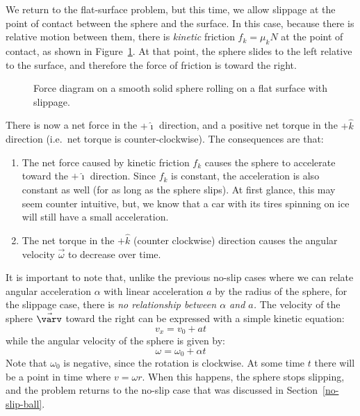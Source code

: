 \documentclass{../../oss-handout}
\newcommand{\iii}{\hat\imath}}
\newcommand{\kkk}{\hat k}}
\begin{document}
We return to the flat-surface problem, but this time, we allow slippage at the
point of contact between the sphere and the surface. In this case, because there
is relative motion between them, there is \emph{kinetic} friction $f_k=\mu_kN$
at the point of contact, as shown in Figure~\ref{slip1}. At that point, the
sphere slides to the left relative to the surface, and therefore the force of
friction is toward the right.
\begin{figure}[!ht]
  \centering
  \caption{Force diagram on a smooth solid sphere rolling on a flat surface with
    slippage.}
  \label{slip1}
\end{figure}

There is now a net force in the $+\iii$ direction, and a positive net torque in
the $+\kkk$ direction (i.e.\ net torque is counter-clockwise). The consequences
are that:
\begin{enumerate}[topsep=0pt]
\item The net force caused by kinetic friction $f_k$ causes the sphere to
  accelerate toward the $+\iii$ direction. Since $f_k$ is constant, the
  acceleration is also constant as well (for as long as the sphere slips). At
  first glance, this may seem counter intuitive, but, we know that a car with
  its tires spinning on ice will still have a small acceleration.
\item The net torque in the $+\kkk$ (counter clockwise) direction
  causes the angular velocity $\vec\omega$ to decrease over time.
\end{enumerate}
It is important to note that, unlike the previous no-slip cases where we can 
relate angular acceleration $\alpha$ with linear acceleration $a$ by the radius
of the sphere, for the slippage case, there is \emph{no relationship between
  $\alpha$ and $a$.} The velocity of the sphere $\vec\varv$ toward the right can
be expressed with a simple kinetic equation:
\begin{equation}
  v_x=v_0+at
\end{equation}
while the angular velocity of the sphere is given by:
\begin{equation}
  \omega=\omega_0+\alpha t
\end{equation}
Note that $\omega_0$ is negative, since the rotation is clockwise. At some time
$t$ there will be a point in time where $v=\omega r$. When this happens, the
sphere stops slipping, and the problem returns to the no-slip case that was
discussed in Section~\ref{no-slip-ball}.
\end{document}
